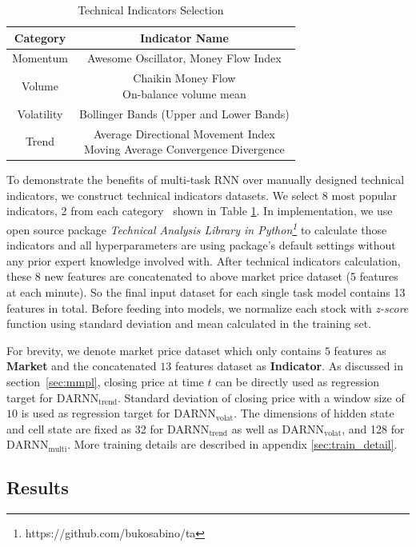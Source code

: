 \begin{table}[H]
\centering
\small
\caption{Technical Indicators Selection}
\begin{tabular}{|c|c|} \hline
  Category&Indicator Name\\ \hline
  Momentum& Awesome Oscillator, Money Flow Index\\ \hline
  Volume& \makecell{Chaikin Money Flow\\ On-balance volume mean}\\ \hline
  Volatility& Bollinger Bands (Upper and Lower Bands)\\ \hline
  Trend& \makecell{Average Directional Movement Index\\Moving Average Convergence Divergence}\\ \hline
\end{tabular}
  \label{tab:ta}
\end{table}
To demonstrate the benefits of multi-task RNN over manually designed
technical indicators, we construct technical
indicators datasets. We select 8 most popular indicators, 2 from each
category~\cite{kirkpatrick2010technical} shown in Table
\ref{tab:ta}. In implementation, we use open source package
\emph{Technical Analysis Library in
  Python\footnote{https://github.com/bukosabino/ta}} to calculate
those indicators and all hyperparameters are using package's
default settings without any prior expert knowledge involved
with. After technical indicators calculation, these 8 new
features are concatenated to above market price dataset (5
features at each minute). So the final input dataset for each
single task model contains 13 features in total. Before feeding
into models, we normalize each stock with \emph{z-score} function
using standard deviation and mean calculated in the training set.

For brevity, we denote market price dataset which only contains
$5$ features as \textbf{Market} and the concatenated $13$
features dataset as \textbf{Indicator}. As discussed in
section~\ref{sec:mmpl}, closing price at time $t$ can be directly
used as regression target for $\text{DARNN}_{\text{trend}}$.
Standard deviation of closing price with a window size of $10$ is
used as regression target for $\text{DARNN}_{\text{volat}}$. The
dimensions of hidden state and cell state are fixed as 32 for
$\text{DARNN}_{\text{trend}}$ as well as
$\text{DARNN}_{\text{volat}}$, and 128 for
$\text{DARNN}_{\text{multi}}$. More training details are
described in appendix \ref{sec:train_detail}.

\subsection{Results}
\label{sec:res}

